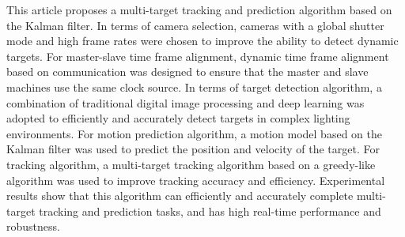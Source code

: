 \begin{eabstract}
  This article proposes a multi-target tracking and prediction algorithm based on the Kalman filter. In terms of camera selection, cameras with a global shutter mode and high frame rates were chosen to improve the ability to detect dynamic targets. For master-slave time frame alignment, dynamic time frame alignment based on communication was designed to ensure that the master and slave machines use the same clock source. In terms of target detection algorithm, a combination of traditional digital image processing and deep learning was adopted to efficiently and accurately detect targets in complex lighting environments. For motion prediction algorithm, a motion model based on the Kalman filter was used to predict the position and velocity of the target. For tracking algorithm, a multi-target tracking algorithm based on a greedy-like algorithm was used to improve tracking accuracy and efficiency. Experimental results show that this algorithm can efficiently and accurately complete multi-target tracking and prediction tasks, and has high real-time performance and robustness.
\end{eabstract}
